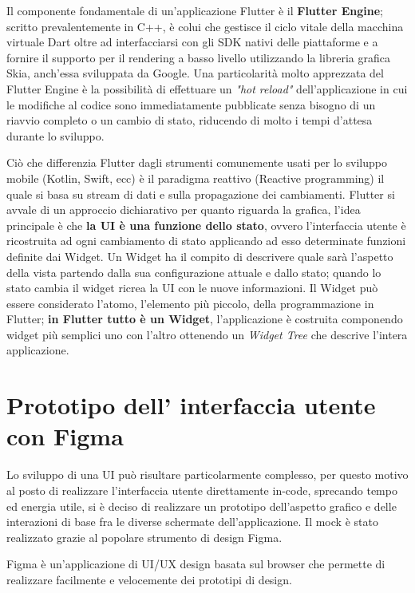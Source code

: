 Il componente fondamentale di un'applicazione Flutter è il {\bfseries Flutter Engine}; scritto prevalentemente in C++, è colui che gestisce il ciclo vitale della macchina virtuale Dart oltre ad interfacciarsi con gli SDK nativi delle piattaforme e a fornire il supporto per il rendering a basso livello utilizzando la libreria grafica Skia, anch'essa sviluppata da Google.
Una particolarità molto apprezzata del Flutter Engine è la possibilità di effettuare un {\itshape "hot reload"} dell'applicazione in cui le modifiche al codice sono immediatamente pubblicate senza bisogno di un riavvio completo o un cambio di stato, riducendo di molto i tempi d'attesa durante lo sviluppo.

Ciò che differenzia Flutter dagli strumenti comunemente usati per lo sviluppo mobile (Kotlin, Swift, ecc) è il paradigma reattivo (Reactive programming) il quale si basa su stream di dati e sulla propagazione dei cambiamenti.
Flutter si avvale di un approccio dichiarativo per quanto riguarda la grafica, l'idea principale è che {\bfseries la UI è una funzione dello stato}, ovvero l'interfaccia utente è ricostruita ad ogni cambiamento di stato applicando ad esso determinate funzioni definite dai Widget. 
Un Widget ha il compito di descrivere quale sarà l'aspetto della vista partendo dalla sua configurazione attuale e dallo stato; quando lo stato cambia il widget ricrea la UI con le nuove informazioni. Il Widget può essere considerato l'atomo, l'elemento più piccolo, della programmazione in Flutter; {\bfseries in Flutter tutto è un Widget}, l'applicazione è costruita componendo widget più semplici uno con l'altro ottenendo un {\itshape Widget Tree} che descrive l'intera applicazione.

\section{Prototipo dell' interfaccia utente con Figma}
Lo sviluppo di una UI può risultare particolarmente complesso, per questo motivo al posto di realizzare l'interfaccia utente direttamente in-code, sprecando tempo ed energia utile, si è deciso di realizzare un prototipo dell'aspetto grafico e delle interazioni di base fra le diverse schermate dell'applicazione.
Il mock è stato realizzato grazie al popolare strumento di design Figma.

Figma è un'applicazione di UI/UX design basata sul browser che permette di realizzare facilmente e velocemente dei prototipi di design.

